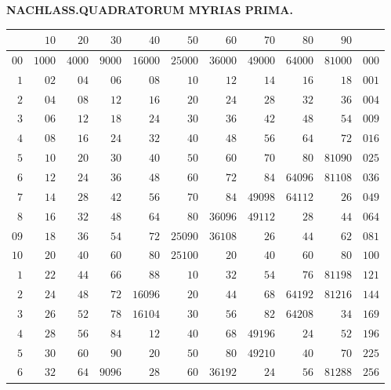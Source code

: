 \clearpage{}%
\renewcommand{\BookRunningTitle}{Quadratorum myrias prima}
\begin{center}\textbf{NACHLASS.\quad QUADRATORUM MYRIAS PRIMA.}\end{center}
\begingroup\fontsize{8.5}{10}\selectfont\setlength{\tabcolsep}{2pt}\renewcommand{\arraystretch}{1}
\begin{longtable}{@{}r|r|r|r|r|r|r|r|r|r|r@{}}
\hline
 & $10$ & $20$ & $30$ & $40$ & $50$ & $60$ & $70$ & $80$ & $90$ & \\
\hline\endhead
$00$ & $1000$ & $4000$ & $9000$ & $16000$ & $25000$ & $36000$ & $49000$ & $64000$ & $81000$ & $000$\\
$1$ & $02$ & $04$ & $06$ & $08$ & $10$ & $12$ & $14$ & $16$ & $18$ & $001$\\
$2$ & $04$ & $08$ & $12$ & $16$ & $20$ & $24$ & $28$ & $32$ & $36$ & $004$\\
$3$ & $06$ & $12$ & $18$ & $24$ & $30$ & $36$ & $42$ & $48$ & $54$ & $009$\\
$4$ & $08$ & $16$ & $24$ & $32$ & $40$ & $48$ & $56$ & $64$ & $72$ & $016$\\
$5$ & $10$ & $20$ & $30$ & $40$ & $50$ & $60$ & $70$ & $80$ & $81090$ & $025$\\
$6$ & $12$ & $24$ & $36$ & $48$ & $60$ & $72$ & $84$ & $64096$ & $81108$ & $036$\\
$7$ & $14$ & $28$ & $42$ & $56$ & $70$ & $84$ & $49098$ & $64112$ & $26$ & $049$\\
$8$ & $16$ & $32$ & $48$ & $64$ & $80$ & $36096$ & $49112$ & $28$ & $44$ & $064$\\
$09$ & $18$ & $36$ & $54$ & $72$ & $25090$ & $36108$ & $26$ & $44$ & $62$ & $081$\\
$10$ & $20$ & $40$ & $60$ & $80$ & $25100$ & $20$ & $40$ & $60$ & $80$ & $100$\\
$1$ & $22$ & $44$ & $66$ & $88$ & $10$ & $32$ & $54$ & $76$ & $81198$ & $121$\\
$2$ & $24$ & $48$ & $72$ & $16096$ & $20$ & $44$ & $68$ & $64192$ & $81216$ & $144$\\
$3$ & $26$ & $52$ & $78$ & $16104$ & $30$ & $56$ & $82$ & $64208$ & $34$ & $169$\\
$4$ & $28$ & $56$ & $84$ & $12$ & $40$ & $68$ & $49196$ & $24$ & $52$ & $196$\\
$5$ & $30$ & $60$ & $90$ & $20$ & $50$ & $80$ & $49210$ & $40$ & $70$ & $225$\\
$6$ & $32$ & $64$ & $9096$ & $28$ & $60$ & $36192$ & $24$ & $56$ & $81288$ & $256$\\

\end{longtable}
